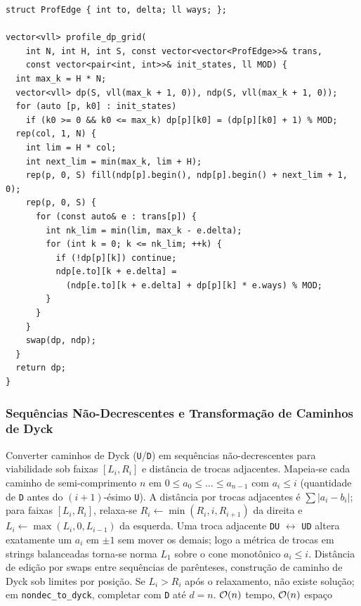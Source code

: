 \begin{lstlisting}
struct ProfEdge { int to, delta; ll ways; };

vector<vll> profile_dp_grid(
    int N, int H, int S, const vector<vector<ProfEdge>>& trans,
    const vector<pair<int, int>>& init_states, ll MOD) {
  int max_k = H * N;
  vector<vll> dp(S, vll(max_k + 1, 0)), ndp(S, vll(max_k + 1, 0));
  for (auto [p, k0] : init_states)
    if (k0 >= 0 && k0 <= max_k) dp[p][k0] = (dp[p][k0] + 1) % MOD;
  rep(col, 1, N) {
    int lim = H * col;
    int next_lim = min(max_k, lim + H);
    rep(p, 0, S) fill(ndp[p].begin(), ndp[p].begin() + next_lim + 1, 0);
    rep(p, 0, S) {
      for (const auto& e : trans[p]) {
        int nk_lim = min(lim, max_k - e.delta);
        for (int k = 0; k <= nk_lim; ++k) {
          if (!dp[p][k]) continue;
          ndp[e.to][k + e.delta] =
            (ndp[e.to][k + e.delta] + dp[p][k] * e.ways) % MOD;
        }
      }
    }
    swap(dp, ndp);
  }
  return dp;
}
\end{lstlisting}

\subsubsection{Sequências Não-Decrescentes e Transformação de Caminhos de Dyck}
\algobox
  {Converter caminhos de Dyck (\texttt{U}/\texttt{D}) em sequências não-decrescentes para viabilidade sob faixas $[L_i, R_i]$ e distância de trocas adjacentes.}
  {Mapeia-se cada caminho de semi-comprimento $n$ em $0 \le a_0 \le \dots \le a_{n-1}$ com $a_i \le i$ (quantidade de \texttt{D} antes do $(i+1)$-ésimo \texttt{U}). A distância por trocas adjacentes é $\sum |a_i - b_i|$; para faixas $[L_i, R_i]$, relaxa-se $R_i \gets \min(R_i, i, R_{i+1})$ da direita e $L_i \gets \max(L_i, 0, L_{i-1})$ da esquerda.}
  {Uma troca adjacente \texttt{DU} $\leftrightarrow$ \texttt{UD} altera exatamente um $a_i$ em $\pm 1$ sem mover os demais; logo a métrica de trocas em strings balanceadas torna-se norma $L_1$ sobre o cone monotônico $a_i \le i$.}
  {Distância de edição por swaps entre sequências de parênteses, construção de caminho de Dyck sob limites por posição.}
  {Se $L_i > R_i$ após o relaxamento, não existe solução; em \texttt{nondec\_to\_dyck}, completar com \texttt{D} até $d = n$.}
  {$\mathcal{O}(n)$ tempo, $\mathcal{O}(n)$ espaço}

